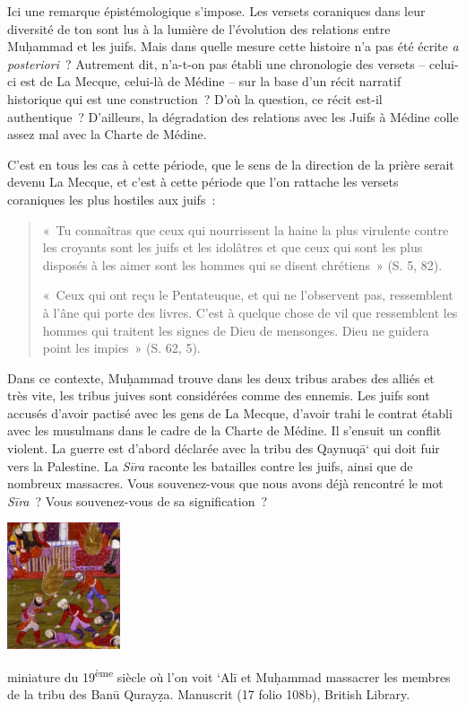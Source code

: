 Ici une remarque épistémologique s'impose. Les versets coraniques dans
leur diversité de ton sont lus à la lumière de l'évolution des relations
entre Muḥammad et les juifs. Mais dans quelle mesure cette histoire n'a
pas été écrite \emph{a posteriori}~? Autrement dit, n'a-t-on pas établi
une chronologie des versets -- celui-ci est de La Mecque, celui-là de
Médine -- sur la base d'un récit narratif historique qui est une
construction~? D'où la question, ce récit est-il authentique~?
D'ailleurs, la dégradation des relations avec les Juifs à Médine colle
assez mal avec la Charte de Médine.

C'est en tous les cas à cette période, que le sens de la direction de la
prière serait devenu La Mecque, et c'est à cette période que l'on
rattache les versets coraniques les plus hostiles aux juifs~:

\begin{quote}
    

«~Tu connaîtras que ceux qui nourrissent la haine la plus virulente
contre les croyants sont les juifs et les idolâtres et que ceux qui sont
les plus disposés à les aimer sont les hommes qui se disent chrétiens~»
(S. 5, 82).

«~Ceux qui ont reçu le Pentateuque, et qui ne l'observent pas,
ressemblent à l'âne qui porte des livres. C'est à quelque chose de vil
que ressemblent les hommes qui traitent les signes de Dieu de mensonges.
Dieu ne guidera point les impies~» (S. 62, 5).
\end{quote}
Dans ce contexte, Muḥammad trouve dans les deux tribus arabes des alliés
et très vite, les tribus juives sont considérées comme des ennemis. Les
juifs sont accusés d'avoir pactisé avec les gens de La Mecque, d'avoir
trahi le contrat établi avec les musulmans dans le cadre de la Charte de
Médine. Il s'ensuit un conflit violent. La guerre est d'abord déclarée
avec la tribu des Qaynuqā` qui doit fuir vers la Palestine. La
\emph{Sīra} raconte les batailles contre les juifs, ainsi que de
nombreux massacres. Vous souvenez-vous que nous avons déjà rencontré le
mot \emph{Sīra}~? Vous souvenez-vous de sa signification~?

\begin{marginfigure}
    \centering
    \includegraphics[width=1.31707in,height=1.45946in]{Images/image031.jpg}
    \caption{miniature du
19\textsuperscript{ème} siècle où l'on voit `Alī et Muḥammad massacrer
les membres de la tribu des Banū Qurayẓa. Manuscrit (17 folio 108b),
British Library.}
   
\end{marginfigure}
 
